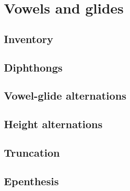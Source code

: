 \chapter{Vowels and glides}

\section{Inventory}

\section{Diphthongs}

\section{Vowel-glide alternations}

\section{Height alternations}

\section{Truncation}

\section{Epenthesis}
